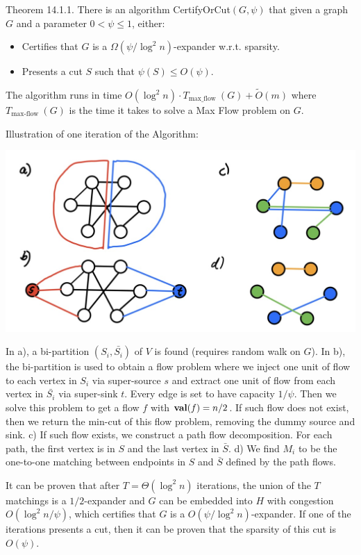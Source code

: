 Theorem 14.1.1. There is an algorithm CertifyOrCut$(G, \psi)$ that given a graph $G$ and a parameter $0<\psi \leq 1$, either:
\begin{itemize}
    \item Certifies that $G$ is a $\Omega\left(\psi / \log ^{2} n\right)$-expander w.r.t. sparsity.
    \item Presents a cut $S$ such that $\psi(S) \leq O(\psi)$.
\end{itemize}
The algorithm runs in time $O\left(\log^{2} n\right) \cdot T_{\text {max\_flow }}(G)+\tilde{O}(m)$ where $T_{\text{max-flow }}(G)$ is the time it takes to solve a Max Flow problem on $G$.

Illustration of one iteration of the Algorithm:

\begin{center}
\includegraphics[width=.6\columnwidth]{imgs/cut-match.png}
\end{center}

 In a), a bi-partition $(S_i, \bar{S_i})$ of $V$ is found (requires random walk on $G$). In b), the bi-partition is used to obtain a flow problem where we inject one unit of flow to each vertex in $S_i$ via super-source $s$ and extract one unit of flow from each vertex in $\bar{S_i}$ via super-sink $t$. Every edge is set to have capacity $1/\psi$. Then we solve this problem to get a flow $f$ with $\operatorname{\textbf{val}}(f)=n/2$. If such flow does not exist, then we return the min-cut of this flow problem, removing the dummy source and sink.  c) If such flow exists, we construct a path flow decomposition. For each path, the first vertex is in $S$ and the last vertex in $\bar{S}$. d) We find $M_{i}$ to be the one-to-one matching between endpoints in $S$ and $\bar{S}$ defined by the path flows.

 It can be proven that after $T=\Theta(\log^2 n)$ iterations, the union of the $T$ matchings is a $1/2$-expander and $G$ can be embedded into $H$ with congestion $O(\log^2 n / \psi)$, which certifies that $G$ is a $O(\psi / \log^2 n)$-expander. If one of the iterations presents a cut, then it can be proven that the sparsity of this cut is $O(\psi)$.